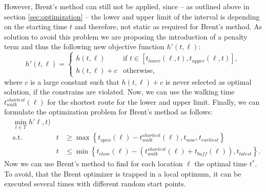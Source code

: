  However, Brent's method can still not be applied, since -- as outlined above in section \ref{sec:optimization} -- the lower and upper limit of the interval is depending on the starting time $t$ and therefore, not static as required for Brent's method. As solution to avoid this problem we are proposing the introduction of a penalty term and thus the following new objective function $h'(t,\ell)$:
 \begin{equation}
 \label{eq:optimal-time-penality}
 h'(t,\ell) = \begin{cases}
 h(t,\ell) & \text{if }t \in [t_{lower}(\ell, t), t_{upper}(\ell, t)],\\
 h(t,\ell)  + c & \text{otherwise,}
 \end{cases}
 \end{equation}
 where $c$ is a large constant such that $h(t,\ell) + c$ is never selected as optimal solution, if the constrains are violated. Now, we can use the walking time $t_{walk}^{shortest}(\ell)$  for the shortest route for the lower and upper limit. Finally, we can formulate the optimization problem for Brent's method as follows:
 \begin{subequations}
 	\label{eq:brent-optimization-problem}
 	\begin{alignat}{2}
 	&\min_{t \in T} h'\ell, t) && \\
 	&\text{s.t.} & t & \geq \max\left\lbrace  t_{open}(\ell)-t_{walk}^{shortest}(\ell), t_{now}, t_{earliest} \right\rbrace \\
 	& & t &\leq \min\left\lbrace  t_{close}(\ell)- \left(t_{walk}^{shortest}(\ell) + t_{buff}(\ell)\right), t_{latest} \right\rbrace.
 	\end{alignat}
 \end{subequations}
Now we can use Brent's method to find for each location $\ell$ the optimal time $t^*$. To avoid, that the Brent optimizer is trapped in a local optimum, it can be executed several times with different random start points.
